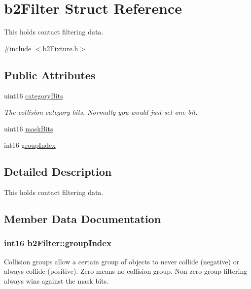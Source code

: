 \hypertarget{structb2_filter}{}\section{b2\+Filter Struct Reference}
\label{structb2_filter}


This holds contact filtering data.  




{\ttfamily \#include $<$b2\+Fixture.\+h$>$}

\subsection*{Public Attributes}
\begin{DoxyCompactItemize}
\item 
uint16 \hyperlink{structb2_filter_a368907397168d39af8b4fc5201d50bba}{category\+Bits}\hypertarget{structb2_filter_a368907397168d39af8b4fc5201d50bba}{}\label{structb2_filter_a368907397168d39af8b4fc5201d50bba}

\begin{DoxyCompactList}\small\item\em The collision category bits. Normally you would just set one bit. \end{DoxyCompactList}\item 
uint16 \hyperlink{structb2_filter_a533cccf85e3ba3d9e3700d73b819f6e2}{mask\+Bits}
\item 
int16 \hyperlink{structb2_filter_a572a8f4a1672f6d5d71123a35e872950}{group\+Index}
\end{DoxyCompactItemize}


\subsection{Detailed Description}
This holds contact filtering data. 

\subsection{Member Data Documentation}
\subsubsection[{\texorpdfstring{group\+Index}{groupIndex}}]{\setlength{\rightskip}{0pt plus 5cm}int16 b2\+Filter\+::group\+Index}\hypertarget{structb2_filter_a572a8f4a1672f6d5d71123a35e872950}{}\label{structb2_filter_a572a8f4a1672f6d5d71123a35e872950}
Collision groups allow a certain group of objects to never collide (negative) or always collide (positive). Zero means no collision group. Non-\/zero group filtering always wins against the mask bits. 
